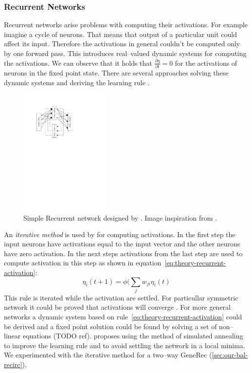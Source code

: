 \subsubsection{Recurrent Networks}
\label{sec:theory-recurrent} 

Recurrent networks arise problems with computing their activations. For example imagine a cycle of neurons. That means that output of a particular unit could affect its input. Therefore the activations in general couldn't be computed only by one forward pass. This introduces real--valued dynamic systems for computing the activations. We can observe that it holds that $\frac{\partial\eta}{\partial t} = 0$ for the activations of neurons in the fixed point state. There are several approaches solving these dynamic systems and deriving the learning rule \cite{pineda1987generalization, pearlmutter1989learning, williams1989learning, elman1990finding, haykin1994neural}. 

\begin{figure}[H]
  \centering
  \includegraphics[width=0.4\textwidth]{img/models-recurrent.pdf}    
  \caption{Simple Recurrent network designed by \citet{elman1990finding}. Image inspiration from \citet{haykin1994neural}.} 
  \label{fig:theory-recurrent}
\end{figure}

An \emph{iterative method} is used by \citet{movellan1990contrastive} for computing activations. In the first step the input neurons have activations equal to the input vector and the other neurons have zero activation. In the next steps activations from the last step are used to compute activation in this step as shown in equation~\ref{eq:theory-recurrent-activation}: 
\begin{equation}
  \label{eq:theory-recurrent-activation} 
  \eta_i(t+1) = \phi(\sum_j w_{ji}\eta_i(t)
\end{equation}
This rule is iterated while the activation are settled. For particullar symmetric network it could be proved that activations will converge \citep{o1996bio}. For more general networks a dynamic system based on rule~\ref{eq:theory-recurrent-activation} could be derived and a fixed point solution could be found by solving a set of non--linear equations (TODO ref). \citet{movellan1990contrastive} proposes using the method of simulated annealing \citep{kirkpatrick1983optimization,vcerny1985thermodynamical} to improve the learning rule and to avoid settling the network in a local minima. We experimented with the iterative method for a two--way GeneRec (\ref{sec:our-bal-recirc}). 

